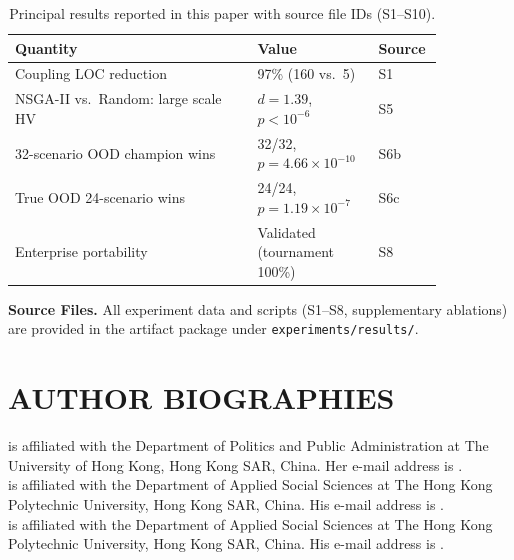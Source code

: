\documentclass{wscpaperproc}
\begin{document}
\begin{table}[ht]
\caption{Principal results reported in this paper with source file IDs (S1--S10).}
\label{tab:appendix-results}
\centering\small
\begin{tabular}{p{0.52\linewidth}p{0.23\linewidth}p{0.1\linewidth}}
\toprule
Quantity & Value & Source \\
\midrule
Coupling LOC reduction & 97\% (160 vs.\ 5) & S1 \\
NSGA-II vs.\ Random: large scale HV & $d=1.39$, $p<10^{-6}$ & S5 \\
32-scenario OOD champion wins & 32/32, $p=4.66\!\times\!10^{-10}$ & S6b \\
True OOD 24-scenario wins & 24/24, $p=1.19\!\times\!10^{-7}$ & S6c \\
Enterprise portability & Validated (tournament 100\%) & S8 \\
\bottomrule
\end{tabular}
\end{table}

\noindent\textbf{Source Files.} All experiment data and scripts (S1--S8, supplementary ablations)
are provided in the artifact package under \texttt{experiments/results/}.

\begingroup
\small


\endgroup

\section*{AUTHOR BIOGRAPHIES}

 is affiliated with the Department of Politics and Public Administration at The University of Hong Kong, Hong Kong SAR, China. Her e-mail address is .\\

 is affiliated with the Department of Applied Social Sciences at The Hong Kong Polytechnic University, Hong Kong SAR, China. His e-mail address is .\\

 is affiliated with the Department of Applied Social Sciences at The Hong Kong Polytechnic University, Hong Kong SAR, China. His e-mail address is .
\end{document}
